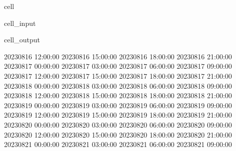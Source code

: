 \documentclass[letterpaper,10pt,english]{jupyterBook}
\begin{document}
\begin{sphinxuseclass}{cell}\begin{sphinxVerbatimInput}

\begin{sphinxuseclass}{cell_input}
\begin{sphinxVerbatim}[commandchars=\\\{\}]
   \PYG{p}{[}\PYG{p}{]}
    \PYG{p}{[}\PYG{p}{]}
\end{sphinxVerbatim}

\end{sphinxuseclass}\end{sphinxVerbatimInput}
\begin{sphinxVerbatimOutput}

\begin{sphinxuseclass}{cell_output}
\begin{sphinxVerbatim}[commandchars=\\\{\}]
2023\PYGZhy{}08\PYGZhy{}16 12:00:00
2023\PYGZhy{}08\PYGZhy{}16 15:00:00
2023\PYGZhy{}08\PYGZhy{}16 18:00:00
2023\PYGZhy{}08\PYGZhy{}16 21:00:00
2023\PYGZhy{}08\PYGZhy{}17 00:00:00
2023\PYGZhy{}08\PYGZhy{}17 03:00:00
2023\PYGZhy{}08\PYGZhy{}17 06:00:00
2023\PYGZhy{}08\PYGZhy{}17 09:00:00
2023\PYGZhy{}08\PYGZhy{}17 12:00:00
2023\PYGZhy{}08\PYGZhy{}17 15:00:00
2023\PYGZhy{}08\PYGZhy{}17 18:00:00
2023\PYGZhy{}08\PYGZhy{}17 21:00:00
2023\PYGZhy{}08\PYGZhy{}18 00:00:00
2023\PYGZhy{}08\PYGZhy{}18 03:00:00
2023\PYGZhy{}08\PYGZhy{}18 06:00:00
2023\PYGZhy{}08\PYGZhy{}18 09:00:00
2023\PYGZhy{}08\PYGZhy{}18 12:00:00
2023\PYGZhy{}08\PYGZhy{}18 15:00:00
2023\PYGZhy{}08\PYGZhy{}18 18:00:00
2023\PYGZhy{}08\PYGZhy{}18 21:00:00
2023\PYGZhy{}08\PYGZhy{}19 00:00:00
2023\PYGZhy{}08\PYGZhy{}19 03:00:00
2023\PYGZhy{}08\PYGZhy{}19 06:00:00
2023\PYGZhy{}08\PYGZhy{}19 09:00:00
2023\PYGZhy{}08\PYGZhy{}19 12:00:00
2023\PYGZhy{}08\PYGZhy{}19 15:00:00
2023\PYGZhy{}08\PYGZhy{}19 18:00:00
2023\PYGZhy{}08\PYGZhy{}19 21:00:00
2023\PYGZhy{}08\PYGZhy{}20 00:00:00
2023\PYGZhy{}08\PYGZhy{}20 03:00:00
2023\PYGZhy{}08\PYGZhy{}20 06:00:00
2023\PYGZhy{}08\PYGZhy{}20 09:00:00
2023\PYGZhy{}08\PYGZhy{}20 12:00:00
2023\PYGZhy{}08\PYGZhy{}20 15:00:00
2023\PYGZhy{}08\PYGZhy{}20 18:00:00
2023\PYGZhy{}08\PYGZhy{}20 21:00:00
2023\PYGZhy{}08\PYGZhy{}21 00:00:00
2023\PYGZhy{}08\PYGZhy{}21 03:00:00
2023\PYGZhy{}08\PYGZhy{}21 06:00:00
2023\PYGZhy{}08\PYGZhy{}21 09:00:00
\end{sphinxVerbatim}

\end{sphinxuseclass}\end{sphinxVerbatimOutput}

\end{sphinxuseclass}
\end{document}
